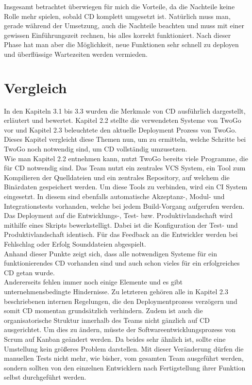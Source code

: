 Insgesamt betrachtet überwiegen für mich die Vorteile, da die Nachteile keine Rolle mehr spielen, sobald \acs{CD} komplett umgesetzt ist. Natürlich muss man, gerade während der Umsetzung, auch die Nachteile beachten und muss mit einer gewissen Einführungszeit rechnen, bis alles korrekt funktioniert. Nach dieser Phase hat man aber die Möglichkeit, neue Funktionen sehr schnell zu deployen und überflüssige Wartezeiten werden vermieden.


\section{Vergleich}
In den Kapiteln 3.1 bis 3.3 wurden die Merkmale von \acs{CD} ausführlich dargestellt, erläutert und bewertet. Kapitel 2.2 stellte die verwendeten Systeme von TwoGo vor und Kapitel 2.3 beleuchtete den aktuelle Deployment Prozess von TwoGo. Dieses Kapitel vergleicht diese Themen nun, um zu ermitteln, welche Schritte bei TwoGo noch notwendig sind, um \acs{CD} vollständig umzusetzen. \\
Wie man Kapitel 2.2 entnehmen kann, nutzt TwoGo bereits viele Programme, die für \acs{CD} notwendig sind. Das Team nutzt ein zentrales \acs{VCS} System, ein Tool zum Kompilieren der Quelldateien und ein zentrales Repository, auf welchem die Binärdaten gespeichert werden. Um diese Tools zu verbinden, wird ein \acs{CI} System eingesetzt. In diesem sind ebenfalls automatische Akzeptanz-, Modul- und Integrationstests vorhanden, welche bei jedem Build-Vorgang aufgerufen werden. Das Deployment auf die Entwicklungs-, Test- bzw. Produktivlandschaft wird mithilfe eines Skripts bewerkstelligt. Dabei ist die Konfiguration der Test- und Produktivlandschaft identisch. Für das Feedback an die Entwickler werden bei Fehlschlag oder Erfolg Sounddateien abgespielt.\\
Anhand dieser Punkte zeigt sich, dass alle notwendigen Systeme für ein funktionierendes \acs{CD} vorhanden sind und auch schon vieles für ein erfolgreiches \acs{CD} getan wurde.\\
Andererseits fehlen immer noch einige Elemente und es gibt unternehmensbedingte Hindernisse. Zu letzteren gehören alle in Kapitel 2.3 beschriebenen internen Regelungen, die den Deploymentprozess verzögern und somit \acs{CD} momentan grundsätzlich verhindern. Zudem ist auch die organisatorische Struktur innerhalb des Teams nicht gänzlich auf \acs{CD} ausgerichtet. Um dies zu ändern, müsste der Softwareentwicklungsprozess von Scrum auf Kanban geändert werden. Da beides sehr ähnlich ist, sollte eine Umstellung kein größeres Problem darstellen. Mit dieser Veränderung dürfen die manuellen Tests nicht mehr, wie bisher, vom gesamten Team ausgeführt werden, sondern sollten von den einzelnen Entwicklern nach Fertigstellung ihrer Funktion selbst durchgeführt werden.\\
